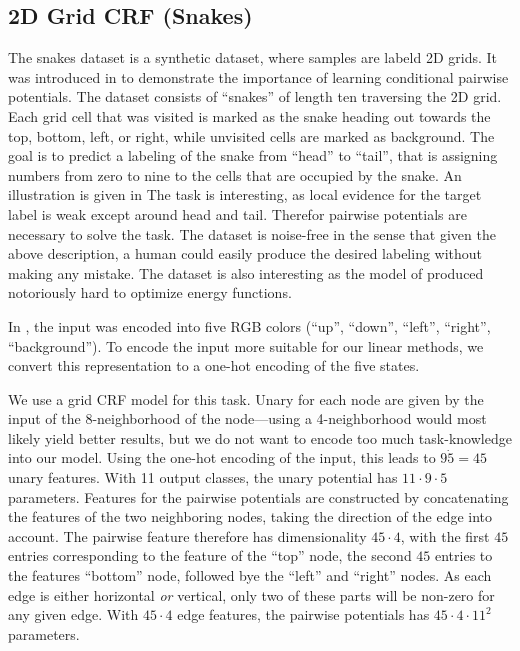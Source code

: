 \subsection{2D Grid CRF (Snakes)}
The snakes dataset is a synthetic dataset, where samples are labeld 2D grids.
It was introduced in \citet{nowozin2011decision} to demonstrate the importance
of learning conditional pairwise potentials. The dataset consists of ``snakes''
of length ten traversing the 2D grid. Each grid cell that was visited is marked
as the snake heading out towards the top, bottom, left, or right, while
unvisited cells are marked as background.  The goal is to predict a labeling of
the snake from ``head'' to ``tail'', that is assigning numbers from zero to
nine to the cells that are occupied by the snake.  An illustration is given in
The task is interesting, as local evidence for the target label is weak except
around head and tail. Therefor pairwise potentials are necessary to solve the
task. The dataset is noise-free in the sense that given the above description, a
human could easily produce the desired labeling without making any mistake.
The dataset is also interesting as the model of \citet{nowozin2011decision} produced
notoriously hard to optimize energy functions.

In \citet{nowozin2011decision}, the input was encoded into five RGB colors
(``up'', ``down'', ``left'', ``right'', ``background'').  To encode the input
more suitable for our linear methods, we convert this representation to a
one-hot encoding of the five states.

We use a grid CRF model for this task. Unary for each node are given by the
input of the 8-neighborhood of the node---using a 4-neighborhood would most
likely yield better results, but we do not want to encode too much
task-knowledge into our model.
Using the one-hot encoding of the input, this leads to $9 \dot 5 = 45$ unary features.
With 11 output classes, the unary potential has $11 \cdot 9 \cdot 5$ parameters.
Features for the pairwise potentials are constructed by concatenating the features
of the two neighboring nodes, taking the direction of the edge into account.
The pairwise feature therefore has dimensionality $45 \cdot 4$, with the first
$45$ entries corresponding to the feature of the ``top'' node, the second $45$
entries to the features ``bottom'' node, followed bye the ``left'' and
``right'' nodes. As each edge is either horizontal \emph{or} vertical, only two
of these parts will be non-zero for any given edge.  With $45 \cdot 4$ edge
features, the pairwise potentials has $45 \cdot 4 \cdot 11^2$ parameters.


